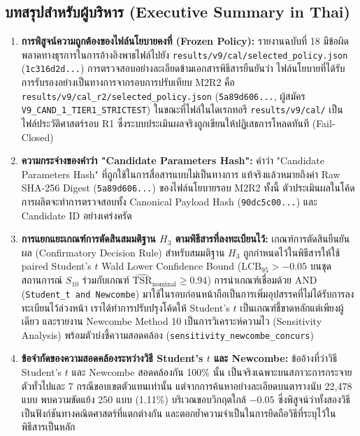 \documentclass[10pt,a4paper]{article}
\begin{document}
\subsection{\thaifont บทสรุปสำหรับผู้บริหาร (Executive Summary in Thai)}
\begin{enumerate}
    \item \textbf{\thaifont การพิสูจน์ความถูกต้องของไฟล์นโยบายคงที่ (Frozen Policy):} {\thaifont รายงานฉบับที่ 18 มีข้อผิดพลาดทางธุรการในการอ้างอิงพาธไฟล์ไปยัง \texttt{results/v9/cal/selected\_policy.json} (\texttt{1c316d2d...}) การตรวจสอบอย่างละเอียดข้ามเอกสารพิธีสารยืนยันว่า ไฟล์นโยบายที่ได้รับการรับรองอย่างเป็นทางการจากรอบการปรับเทียบ M2R2 คือ \texttt{results/v9/cal\_r2/selected\_policy.json} (\texttt{5a89d606...}, ผู้สมัคร \texttt{V9\_CAND\_1\_TIER1\_STRICTEST}) ในขณะที่ไฟล์ในไดเรกทอรี \texttt{results/v9/cal/} เป็นไฟล์ประวัติศาสตร์รอบ R1 ซึ่งระบบประเมินผลจริงถูกเขียนให้ปฏิเสธการโหลดทันที (Fail-Closed)}
    \item \textbf{\thaifont ความกระจ่างของคำว่า "Candidate Parameters Hash":} {\thaifont คำว่า "Candidate Parameters Hash" ที่ถูกใช้ในการสื่อสารแบบไม่เป็นทางการ แท้จริงแล้วหมายถึงค่า Raw SHA-256 Digest (\texttt{5a89d606...}) ของไฟล์นโยบายรอบ M2R2 ทั้งนี้ ตัวประเมินผลในโค้ดการผลิตจะทำการตรวจสอบทั้ง Canonical Payload Hash (\texttt{90dc5c00...}) และ Candidate ID อย่างเคร่งครัด}
    \item \textbf{\thaifont การแยกแยะเกณฑ์การตัดสินสมมติฐาน $H_3$ ตามพิธีสารที่ลงทะเบียนไว้:} {\thaifont เกณฑ์การตัดสินยืนยันผล (Confirmatory Decision Rule) สำหรับสมมติฐาน $H_3$ ถูกกำหนดไว้ในพิธีสารให้ใช้ paired Student's $t$ Wald Lower Confidence Bound ($\mathrm{LCB}_{95} > -0.05$ บนชุดสถานการณ์ $S_{10}$ ร่วมกับเกณฑ์ $\widehat{\mathrm{TSR}}_{\mathrm{nominal}} \ge 0.94$) การนำเกณฑ์เชื่อมด้วย AND (\texttt{Student\_t and Newcombe}) มาใช้ในรอบก่อนหน้าถือเป็นการเพิ่มอุปสรรคที่ไม่ได้รับการลงทะเบียนไว้ล่วงหน้า เราได้ทำการปรับปรุงโค้ดให้ Student's $t$ เป็นเกณฑ์ชี้ขาดหลักแต่เพียงผู้เดียว และรายงาน Newcombe Method 10 เป็นการวิเคราะห์ความไว (Sensitivity Analysis) พร้อมตัวบ่งชี้ความสอดคล้อง (\texttt{sensitivity\_newcombe\_concurs})}
    \item \textbf{\thaifont ข้อจำกัดของความสอดคล้องระหว่างวิธี Student's $t$ และ Newcombe:} {\thaifont ข้ออ้างที่ว่าวิธี Student's $t$ และ Newcombe สอดคล้องกัน 100\% นั้น เป็นจริงเฉพาะบนสภาวะการกระจายตัวทั่วไปและ 7 กรณีขอบเขตตัวแทนเท่านั้น แต่จากการค้นหาอย่างละเอียดบนตารางนับ 22,478 แบบ พบความขัดแย้ง 250 แบบ (1.11\%) บริเวณขอบวิกฤตใกล้ $-0.05$ ซึ่งพิสูจน์ว่าทั้งสองวิธีเป็นฟังก์ชันทางคณิตศาสตร์ที่แตกต่างกัน และตอกย้ำความจำเป็นในการยึดถือวิธีที่ระบุไว้ในพิธีสารเป็นหลัก}

\end{enumerate}
\end{document}
